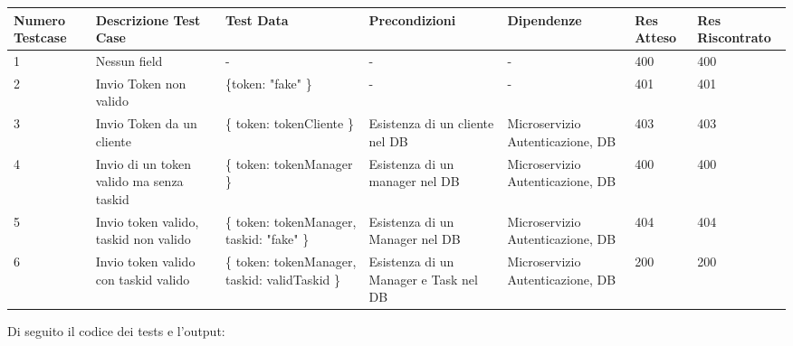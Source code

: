 \documentclass{report}
\begin{document}
\begin{center} %
	\centering
	\begin{tabular}{ |p{1cm}|p{2cm}|p{2cm}|p{2cm}|p{2cm}|p{1cm}|p{1cm}| }
		\hline
		Numero Testcase & Descrizione Test Case & Test Data & Precondizioni & Dipendenze & Res Atteso & Res Riscontrato \\
		\hline
		1 & Nessun field & - & - & - & 400 & 400 \\
		\hline
		2 & Invio Token non valido & \{token: "fake" \} & - & - & 401 & 401 \\
		\hline
		3 & Invio Token da un cliente & \{ token: tokenCliente \} & Esistenza di un cliente nel DB & Microservizio Autenticazione, DB & 403 & 403 \\
		\hline
		4 & Invio di un token valido ma senza taskid & \{ token: tokenManager \} & Esistenza di un manager nel DB & Microservizio Autenticazione, DB & 400 & 400 \\
		\hline
		5 & Invio token valido, taskid non valido & \{ token: tokenManager, taskid: "fake" \} & Esistenza di un Manager nel DB & Microservizio Autenticazione, DB & 404 & 404 \\
		\hline
		6 & Invio token valido con taskid valido & \{ token: tokenManager, taskid: validTaskid \} & Esistenza di un Manager e Task nel DB & Microservizio Autenticazione, DB & 200 & 200 \\
		\hline
	\end{tabular}
\end{center}

Di seguito il codice dei tests e l'output:
\end{document}
